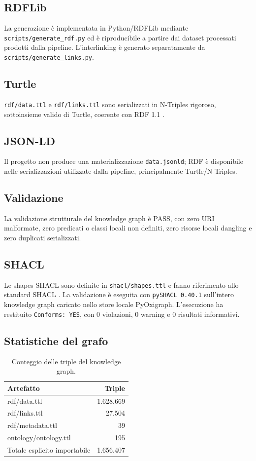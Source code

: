 \documentclass[11pt,a4paper]{article}
\begin{document}
\subsection{RDFLib}
La generazione è implementata in Python/RDFLib mediante \texttt{scripts/generate\_rdf.py} ed è riproducibile a partire dai dataset processati prodotti dalla pipeline. L'interlinking è generato separatamente da \texttt{scripts/generate\_links.py}.
\subsection{Turtle}
\texttt{rdf/data.ttl} e \texttt{rdf/links.ttl} sono serializzati in N-Triples rigoroso, sottoinsieme valido di Turtle, coerente con RDF 1.1 \cite{rdf11}.

\subsection{JSON-LD}
Il progetto non produce una materializzazione \texttt{data.jsonld}; RDF è disponibile nelle serializzazioni utilizzate dalla pipeline, principalmente Turtle/N-Triples.

\subsection{Validazione}
La validazione strutturale del knowledge graph è PASS, con zero URI malformate, zero predicati o classi locali non definiti, zero risorse locali dangling e zero duplicati serializzati.

\subsection{SHACL}
Le shapes SHACL sono definite in \texttt{shacl/shapes.ttl} e fanno riferimento allo standard SHACL \cite{shacl}. La validazione è eseguita con \texttt{pySHACL 0.40.1} sull'intero knowledge graph caricato nello store locale PyOxigraph. L'esecuzione ha restituito \texttt{Conforms: YES}, con 0 violazioni, 0 warning e 0 risultati informativi.

\subsection{Statistiche del grafo}
\begin{table}[H]
\centering
\begin{tabular}{lr}
\toprule
Artefatto & Triple \\
\midrule
rdf/data.ttl & 1.628.669 \\
rdf/links.ttl & 27.504 \\
rdf/metadata.ttl & 39 \\
ontology/ontology.ttl & 195 \\
\midrule
Totale esplicito importabile & 1.656.407 \\
\bottomrule
\end{tabular}
\caption{Conteggio delle triple del knowledge graph.}
\end{table}
\end{document}
